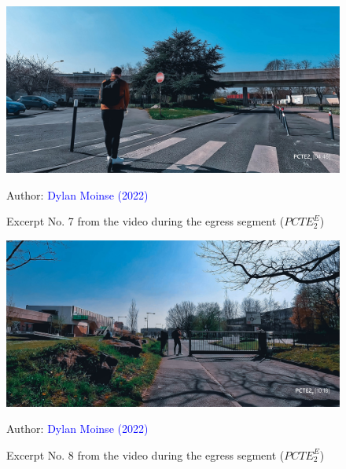     \begin{figure}[h!]\vspace*{4pt}
        \caption*{Excerpt No. 7 from the video during the egress segment (\(PCTE^{E}_{2}\))}
        \centerline{\includegraphics[width=0.75\columnwidth]{src/Figures/Annexes/Extrait_Video_PCTE2_Egress_7.jpg}}
        \vspace{5pt}
        \begin{flushright}\scriptsize{
        Author: \textcolor{blue}{Dylan Moinse (2022)}
        }\end{flushright}
    \end{figure}

    \begin{figure}[h!]\vspace*{4pt}
        \caption*{Excerpt No. 8 from the video during the egress segment (\(PCTE^{E}_{2}\))}
        \centerline{\includegraphics[width=0.75\columnwidth]{src/Figures/Annexes/Extrait_Video_PCTE2_Egress_8.jpg}}
        \vspace{5pt}
        \begin{flushright}\scriptsize{
        Author: \textcolor{blue}{Dylan Moinse (2022)}
        }\end{flushright}
    \end{figure}

